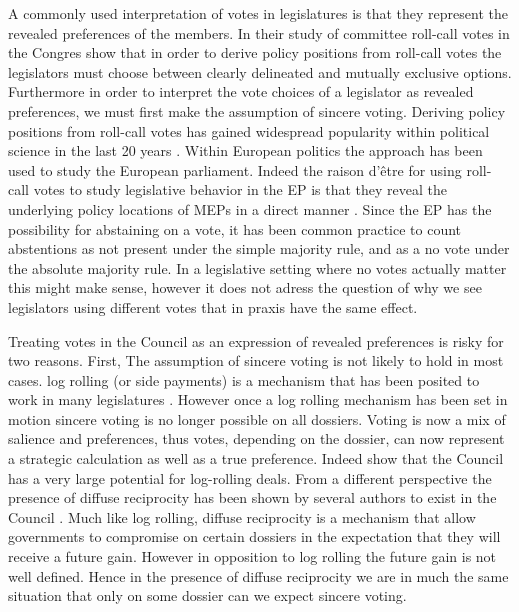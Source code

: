 A commonly used interpretation of votes in legislatures is that they represent the revealed preferences of the members. In their study of committee roll-call votes in the Congres \citet{KrehbielRivers1988} show that in order to derive policy positions from roll-call votes the legislators must choose between clearly delineated and mutually exclusive options. Furthermore in order to interpret the vote choices of a legislator as revealed preferences, we must first make the assumption of sincere voting. Deriving policy positions from roll-call votes has gained widespread popularity within political science in the last 20 years \citetext{see \citealt{volden1998,Schickler2000,ClintonJackmanRivers2004}}. Within European politics the approach has been used to study the European parliament. Indeed the raison d'être for using roll-call votes to study legislative behavior in the EP is that they reveal the underlying policy locations of MEPs in a direct manner \citep{Hix2002,HixNouryRoland2007,HixNoury2009}. Since the EP has the possibility for abstaining on a vote, it has been common practice to count abstentions as not present under the simple majority rule, and as a no vote under the absolute majority rule. In a legislative setting where no votes actually matter this might make sense, however it does not adress the question of why we see legislators using different votes that in praxis have the same effect.

Treating votes in the Council as an expression of revealed preferences is risky for two reasons. First, The assumption  of sincere voting is not likely to hold in most cases. log rolling (or side payments) is a mechanism that has been posited to work in many legislatures \citep{CarrubaVolden2000,MattilaLane2001}. However once a log rolling mechanism has been set in motion sincere voting is no longer possible on all dossiers. Voting is now a mix of salience and preferences, thus votes, depending on the dossier, can now represent a strategic calculation as well as a true preference. Indeed \citet{KonigJunge2009} show that the Council has a very large potential for log-rolling deals. From a different perspective the presence of diffuse reciprocity \citep{Keohane1986} has been shown by several authors to exist in the Council \citep{Lewis1998,Lewis2003,Jonsson2000}. Much like log rolling, diffuse reciprocity is a mechanism that allow governments to compromise on certain dossiers in the expectation that they will receive a future gain. However in opposition to log rolling the future gain is not well defined. Hence in the presence of diffuse reciprocity we are in much the same situation that only on some dossier can we expect sincere voting.  


